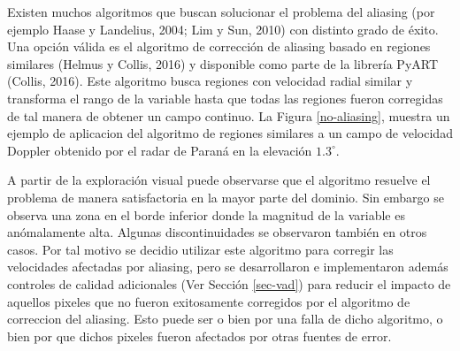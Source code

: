\documentclass[12pt,spanish,oneside, a4paper]{book}
\begin{document}
Existen muchos algoritmos que buscan solucionar el problema del aliasing
(por ejemplo Haase y Landelius, 2004; Lim y Sun, 2010) con distinto
grado de éxito. Una opción válida es el algoritmo de corrección de
aliasing basado en regiones similares (Helmus y Collis, 2016) y
disponible como parte de la librería PyART (Collis, 2016). Este
algoritmo busca regiones con velocidad radial similar y transforma el
rango de la variable hasta que todas las regiones fueron corregidas de
tal manera de obtener un campo continuo. La Figura \ref{no-aliasing},
muestra un ejemplo de aplicacion del algoritmo de regiones similares a
un campo de velocidad Doppler obtenido por el radar de Paraná en la
elevación \(1.3^{\circ}\).

A partir de la exploración visual puede observarse que el algoritmo
resuelve el problema de manera satisfactoria en la mayor parte del
dominio. Sin embargo se observa una zona en el borde inferior donde la
magnitud de la variable es anómalamente alta. Algunas discontinuidades
se observaron también en otros casos. Por tal motivo se decidio utilizar
este algoritmo para corregir las velocidades afectadas por aliasing,
pero se desarrollaron e implementaron además controles de calidad
adicionales (Ver Sección \ref{sec-vad}) para reducir el impacto de
aquellos pixeles que no fueron exitosamente corregidos por el algoritmo
de correccion del aliasing. Esto puede ser o bien por una falla de dicho
algoritmo, o bien por que dichos pixeles fueron afectados por otras
fuentes de error.
\end{document}

